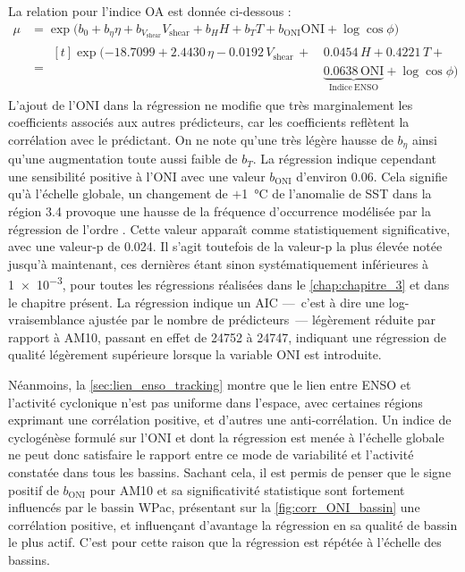 \documentclass[../main.tex]{subfiles}
\begin{document}
La relation pour l'indice OA est donnée ci-dessous :
%
\begin{align*}
    \tag{OA}
    \mu &= \exp \big( b_0 + b_\eta \eta + b_{V_{\mathrm{shear}}} V_{\mathrm{shear}} + b_H H + b_T T + b_{\mathrm{ONI}} \mathrm{ONI} + \log \cos \phi \big)\\
        &= \begin{aligned}[t]\exp \big( \num{-18.7099} + \num{2.4430}\, \eta - \num{0.0192}\, V_{\mathrm{shear}} \,+\, &\num{0.0454}\, H + \num{0.4221}\, T + \\&\underbrace{\num{0.0638}\, \mathrm{ONI}}_{\mathrm{Indice\ ENSO}} + \log \cos \phi \big)\end{aligned}
\end{align*}
%
L'ajout de l'ONI dans la régression ne modifie que très marginalement les coefficients associés aux autres prédicteurs, car les coefficients reflètent la
corrélation avec le prédictant. On ne note qu'une très légère hausse de $b_\eta$ ainsi qu'une augmentation toute aussi faible de $b_T$. La régression indique
cependant une sensibilité positive à l'ONI avec une valeur $b_{\mathrm{ONI}}$ d'environ \num{0.06}. Cela signifie qu'à l'échelle globale, un changement de
$+$\SI{1}{\degreeCelsius} de l'anomalie de SST dans la région 3.4 provoque une hausse de la fréquence d'occurrence modélisée par la régression de l'ordre
. Cette valeur apparaît comme statistiquement significative, avec une valeur-p de \num{0.024}. Il s'agit toutefois de la valeur-p la plus élevée notée
jusqu'à maintenant, ces dernières étant sinon systématiquement inférieures à \num{1e-3}, pour toutes les régressions réalisées dans le \cref{chap:chapitre_3} et
dans le chapitre présent. La régression indique un AIC \parencite[\textit{Akaike Information Criterion},][]{akaike_information_1998} ---~c'est à dire une
log-vraisemblance ajustée par le nombre de prédicteurs~--- légèrement réduite par rapport à AM10, passant en effet de \num{24752} à \num{24747}, indiquant une
régression de qualité légèrement supérieure lorsque la variable ONI est introduite.

Néanmoins, la \cref{sec:lien_enso_tracking} montre que le lien entre ENSO et l'activité cyclonique n'est pas uniforme dans l'espace, avec certaines régions
exprimant une corrélation positive, et d'autres une anti-corrélation. Un indice de cyclogénèse formulé sur l'ONI et dont la régression est menée à l'échelle
globale ne peut donc satisfaire le rapport entre ce mode de variabilité et l'activité constatée dans tous les bassins. Sachant cela, il est permis de penser que
le signe positif de $b_{\mathrm{ONI}}$ pour AM10 et sa significativité statistique sont fortement influencés par le bassin WPac, présentant sur la
\cref{fig:corr_ONI_bassin} une corrélation positive, et influençant d'avantage la régression en sa qualité de bassin le plus actif. C'est pour cette raison que la
régression est répétée à l'échelle des bassins.
\end{document}
